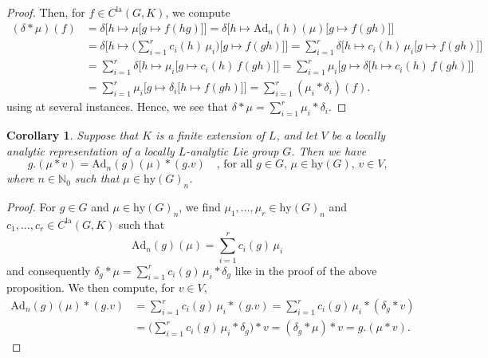 \documentclass[a4paper, reqno, 10pt]{amsart}
\newtheorem{corollary}[theorem]{Corollary}
\theoremstyle{definition}
\numberwithin{equation}{section}
\newcommand{\Ad}{{\mathrm{Ad}}}
\newcommand{\hy}{{\mathrm{hy}}}
\newcommand{\la}{{\mathrm{la}}}
\newcommand{\mto}{\mapsto}
\newcommand{\BN}{{\mathbb {N}}}
\begin{document}
\begin{proof}
	Then, for $f\in C^\la(G,K)$, we compute
	\begin{equation*}
		\begin{aligned}
			(\delta \ast \mu)(f) &= \delta\Big[ h \mto \mu\big[g \mto f(hg)\big] \Big]
			= \delta\Big[ h \mto \Ad_n(h)(\mu) \big[g \mto f(gh) \big] \Big] 	\\
			&= \delta\Bigg[ h \mto \bigg( \sum_{i=1}^r c_i(h) \, \mu_i \bigg)\big[g \mto f(gh)\big] \Bigg] 
			= \sum_{i=1}^r \delta\Big[ h \mto c_i(h) \, \mu_i \big[g \mto f(gh) \big] \Big] 	\\
			&= \sum_{i=1}^r \delta \Big[ h \mto \mu_i \big[ g \mto c_i(h)\, f(gh)\big] \Big] 
			= \sum_{i=1}^r \mu_i \Big[ g \mto \delta \big[ h \mto c_i(h) \, f(gh) \big] \Big]  \\
			&= \sum_{i=1}^r \mu_i \Big[ g \mto \delta_i \big[ h \mto f(gh) \big] \Big]  
			= \sum_{i=1}^r (\mu_i \ast \delta_i) (f) .
		\end{aligned}
	\end{equation*}
	using  at several instances.
	Hence, we see that $\delta \ast \mu = \sum_{i=1}^r \mu_i \ast \delta_i$.
\end{proof}


\begin{corollary}\label{Cor 1 - Locally analytic representation satisfies compatibility condition for adjoint representation}
	Suppose that $K$ is a finite extension of $L$, and let $V$ be a locally analytic representation of a locally $L$-analytic Lie group $G$.
	Then we have
	\begin{equation*}
		g.(\mu \ast v) = \Ad_n(g)(\mu) \ast (g.v) \quad\text{, for all $g\in G$, $\mu \in \hy(G)$, $v \in V$,}
	\end{equation*}
	where $n\in \BN_0$ such that $\mu \in \hy(G)_n$.
\end{corollary}
\begin{proof}
	For $g\in G$ and $\mu \in \hy(G)_n$, we find $\mu_1,\ldots,\mu_r \in \hy(G)_n$ and $c_1,\ldots,c_r \in C^\la(G,K)$ such that
	\begin{equation*}
		\Ad_n(g)(\mu) = \sum_{i=1}^r c_i(g) \, \mu_i
	\end{equation*}
	and consequently $\delta_g \ast \mu = \sum_{i=1}^r c_i(g) \, \mu_i \ast  \delta_g $ like in the proof of the above proposition.
	We then compute, for $v\in V$,
	\begin{align*}
		\Ad_n(g)(\mu) \ast (g.v) 
		&= \sum_{i=1}^r c_i(g) \, \mu_i \ast (g.v) 
		= \sum_{i=1}^r c_i(g) \, \mu_i \ast (\delta_g \ast v) \\
		&= \bigg( \sum_{i=1}^r c_i(g) \, \mu_i \ast \delta_g \bigg) \ast v 
		= ( \delta_g \ast \mu ) \ast v
		= g.(\mu \ast v) .
	\end{align*}
\end{proof}
\end{document}

